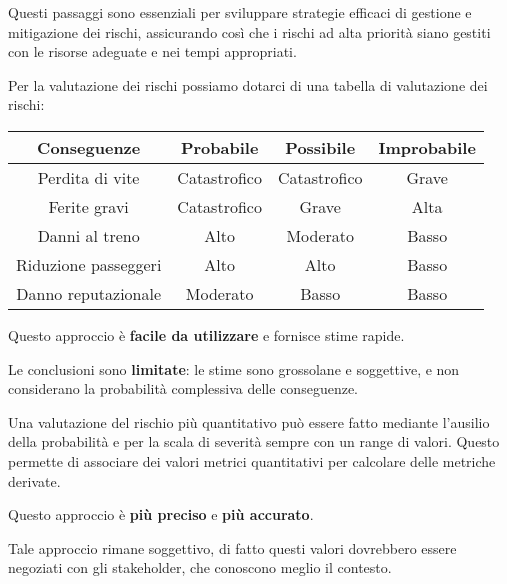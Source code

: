 Questi passaggi sono essenziali per sviluppare strategie efficaci di gestione e mitigazione
dei rischi, assicurando così che i rischi ad alta priorità siano gestiti con le risorse
adeguate e nei tempi appropriati.

Per la valutazione dei rischi possiamo dotarci di una tabella di valutazione dei rischi:
\begin{center}
    \begin{tabular}{|c|c|c|c|}
    \hline
    \textbf{Conseguenze} & \textbf{Probabile} & \textbf{Possibile} & \textbf{Improbabile} \\ \hline
    Perdita di vite      & Catastrofico       & Catastrofico       & Grave                \\ \hline
    Ferite gravi         & Catastrofico       & Grave              & Alta                 \\ \hline
    Danni al treno       & Alto               & Moderato           & Basso                \\ \hline
    Riduzione passeggeri & Alto               & Alto               & Basso                \\ \hline
    Danno reputazionale  & Moderato           & Basso              & Basso                \\ \hline
    \end{tabular}
\end{center}
\begin{tcolorbox}[colback=green!5!white,colframe=green!75!black,title=Pro]
    Questo approccio è \textbf{facile da utilizzare} e fornisce stime rapide.
\end{tcolorbox}
\begin{tcolorbox}[colback=red!5!white,colframe=red!75!black,title=Contro]
    Le conclusioni sono \textbf{limitate}: le stime sono grossolane e soggettive,
    e non considerano la probabilità complessiva delle conseguenze.
\end{tcolorbox}
Una valutazione del rischio più quantitativo può essere fatto mediante 
l'ausilio della probabilità e per la scala di severità sempre con un range di valori.
Questo permette di associare dei valori metrici quantitativi per calcolare delle metriche 
derivate.
\begin{tcolorbox}[colback=green!5!white,colframe=green!75!black,title=Pro]
    Questo approccio è \textbf{più preciso} e \textbf{più accurato}.
\end{tcolorbox}
\begin{tcolorbox}[colback=red!5!white,colframe=red!75!black,title=Contro]
    Tale approccio rimane soggettivo, di fatto questi valori dovrebbero essere 
    negoziati con gli stakeholder, che conoscono meglio il contesto.
\end{tcolorbox}
